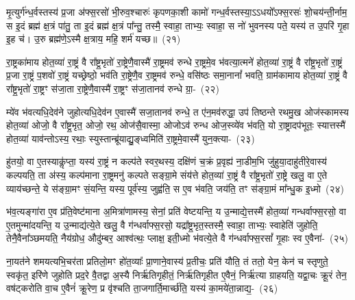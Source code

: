 मृ॒त्युर्ग॑न्ध॒र्वस्तस्य॑ प्र॒जा अ॑फ्स॒रसो॑ भी॒रुव॒श्चारुः॑ कृपणका॒शी कामो॑ गन्ध॒र्वस्तस्या॒\-ऽऽ\-धयो᳚\-ऽफ्स॒रसः॑ शो॒चय॑न्ती॒र्नाम॒ स इ॒दं ब्रह्म॑ क्ष॒त्रं पा॑तु॒ ता इ॒दं ब्रह्म॑ क्ष॒त्रं पा᳚न्तु॒ तस्मै॒ स्वाहा॒ ताभ्यः॒ स्वाहा॒ स नो॑ भुवनस्य पते॒ यस्य॑ त उ॒परि॑ गृ॒हा इ॒ह च॑। उ॒रु ब्रह्म॑णे॒\-ऽस्मै क्ष॒त्राय॒ महि॒ शर्म॑ यच्छ॥~(२१)

{\anuvakamend[{मनो॑\-ऽमृड॒यः षट्च॑त्वारिꣳशच्च}]}%

रा॒ष्ट्रका॑माय होत॒व्या॑ रा॒ष्ट्रं वै रा᳚ष्ट्र॒भृतो॑ रा॒ष्ट्रेणै॒वास्मै॑ रा॒ष्ट्रमव॑ रुन्धे रा॒ष्ट्रमे॒व भ॑वत्या॒त्मने॑ होत॒व्या॑ रा॒ष्ट्रं वै रा᳚ष्ट्र॒भृतो॑ रा॒ष्ट्रं प्र॒जा रा॒ष्ट्रं प॒शवो॑ रा॒ष्ट्रं यच्छ्रेष्ठो॒ भव॑ति रा॒ष्ट्रेणै॒व रा॒ष्ट्रमव॑ रुन्धे॒ वसि॑ष्ठः समा॒नानां᳚ भवति॒ ग्राम॑कामाय होत॒व्या॑ रा॒ष्ट्रं वै रा᳚ष्ट्र॒भृतो॑ रा॒ष्ट्रꣳ स॑जा॒ता रा॒ष्ट्रेणै॒वास्मै॑ रा॒ष्ट्रꣳ स॑जा॒तानव॑ रुन्धे ग्रा॒-~(२२)

म्ये॑व भ॑वत्यधि॒देव॑ने जुहोत्यधि॒देव॑न ए॒वास्मै॑ सजा॒तानव॑ रुन्धे॒ त ए॑न॒मव॑रुद्धा॒ उप॑ तिष्ठन्ते रथमु॒ख ओज॑स्कामस्य होत॒व्या॑ ओजो॒ वै रा᳚ष्ट्र॒भृत॒ ओजो॒ रथ॒ ओज॑सै॒वास्मा॒ ओजो\-ऽव॑ रुन्ध ओज॒स्व्ये॑व भ॑वति॒ यो रा॒ष्ट्रादप॑भूतः॒ स्यात्तस्मै॑ होत॒व्या॑ याव॑न्तो\-ऽस्य॒ रथाः॒ स्युस्तान्ब्रू॑याद्यु॒ङ्‌ध्वमिति॑ रा॒ष्ट्रमे॒वास्मै॑ युन॒क्त्या-~(२३)

हु॑तयो॒ वा ए॒तस्याकॢ॑प्ता॒ यस्य॑ रा॒ष्ट्रं न कल्प॑ते स्वर॒थस्य॒ दक्षि॑णं च॒क्रं प्र॒वृह्य॑ ना॒डीम॒भि जु॑हुया॒दाहु॑तीरे॒वास्य॑ कल्पयति॒ ता अ॑स्य॒ कल्प॑माना रा॒ष्ट्रमनु॑ कल्पते सङ्ग्रा॒मे संय॑त्ते होत॒व्या॑ रा॒ष्ट्रं वै रा᳚ष्ट्र॒भृतो॑ रा॒ष्ट्रे खलु॒ वा ए॒ते व्याय॑च्छन्ते॒ ये स॑ङ्ग्रा॒मꣳ सं॒यन्ति॒ यस्य॒ पूर्व॑स्य॒ जुह्व॑ति॒ स ए॒व भ॑वति॒ जय॑ति॒ तꣳ स॑ङ्ग्रा॒मं मा᳚न्धु॒क इ॒ध्मो~(२४)

भ॑व॒त्यङ्गा॑रा ए॒व प्र॑ति॒वेष्ट॑माना अ॒मित्रा॑णामस्य॒ सेनां॒ प्रति॑ वेष्टयन्ति॒ य उ॒न्माद्ये॒त्तस्मै॑ होत॒व्या॑ गन्धर्वाफ्स॒रसो॒ वा ए॒तमुन्मा॑दयन्ति॒ य उ॒न्माद्य॑त्ये॒ते खलु॒ वै ग॑न्धर्वाफ्स॒रसो॒ यद्रा᳚ष्ट्र॒भृत॒स्तस्मै॒ स्वाहा॒ ताभ्यः॒ स्वाहेति॑ जुहोति॒ तेनै॒वैना᳚ञ्छमयति॒ नैय॑ग्रोध॒ औदु॑म्बर॒ आश्व॑त्थः॒ प्लाक्ष॒ इती॒ध्मो भ॑वत्ये॒ते वै ग॑न्धर्वाफ्स॒रसां᳚ गृ॒हाः स्व ए॒वैना॑-~(२५)

ना॒यत॑ने शमयत्यभि॒चर॑ता प्रतिलो॒मꣳ हो॑त॒व्याः᳚ प्रा॒णाने॒वास्य॑ प्र॒तीचः॒ प्रति॑ यौति॒ तं ततो॒ येन॒ केन॑ च स्तृणुते॒ स्वकृ॑त॒ इरि॑णे जुहोति प्रद॒रे वै॒तद्वा अ॒स्यै निर्\mbox{}ऋ॑तिगृहीतं॒ निर्\mbox{}ऋ॑तिगृहीत ए॒वैनं॒ निर्\mbox{}ऋ॑त्या ग्राहयति॒ यद्वा॒चः क्रू॒रं तेन॒ वष॑ट्करोति वा॒च ए॒वैनं॑ क्रू॒रेण॒ प्र वृ॑श्चति ता॒जगार्ति॒मार्च्छ॑ति॒ यस्य॑ का॒मये॑ता॒न्नाद्य॒-~(२६)

